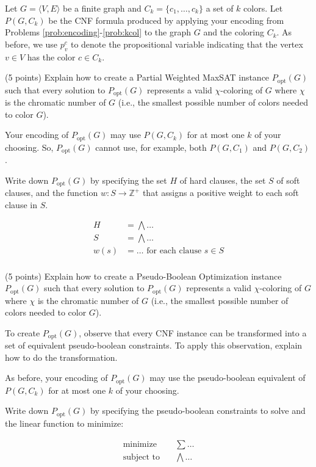 \documentclass{handout}
\begin{document}
Let $G = \langle V, E\rangle$ be a finite graph and $C_k = \{ c_1, \ldots, c_k \}$ a set of $k$ colors. 
Let $P(G, C_k)$ be the CNF formula produced by applying your encoding from Problems \ref{prob:encoding}-\ref{prob:kcol}  
to the graph $G$ and the coloring $C_k$. 
As before, we use $p_v^c$ to denote the propositional variable indicating that the vertex $v\in V$ has the color $c\in C_k$.


\begin{questions}

\item (5 points) Explain how to create a Partial Weighted MaxSAT instance $P_{\text{opt}}(G)$ 
such that every solution to $P_{\text{opt}}(G)$ represents a valid $\chi$-coloring of $G$ where $\chi$ is 
the chromatic number of $G$ (i.e., the smallest possible number of colors needed to color $G$). 

Your encoding of  $P_{\text{opt}}(G)$ may use $P(G, C_k)$ for at most one $k$ of your choosing.  
So, $P_{\text{opt}}(G)$ cannot use, for example, both $P(G, C_1)$ and $P(G, C_2)$.

Write down  $P_{\text{opt}}(G)$ by specifying the set $H$ of hard clauses, 
the set $S$ of soft clauses, and the function $w : S \rightarrow \mathbb{Z^+}$ that assigns a positive weight to each soft clause in $S$. 

\begin{align*}
   H    	&=     \bigwedge \ldots \\
   S    	&=     \bigwedge \ldots \\
   w(s)    	&=    \ldots \text{ for each clause } s  \in S\\ 
\end{align*} 



\item (5 points)  Explain how to create a Pseudo-Boolean Optimization instance $P_{\text{opt}}(G)$ 
such that every solution to $P_{\text{opt}}(G)$ represents a valid $\chi$-coloring of $G$ where $\chi$ is 
the chromatic number of $G$ (i.e., the smallest possible number of colors needed to color $G$). 

To create $P_{\text{opt}}(G)$, observe that every CNF instance  
can be transformed into a set of equivalent pseudo-boolean constraints.  
To apply this observation, explain how to do the transformation. 

As before, your encoding of  $P_{\text{opt}}(G)$ may use the  pseudo-boolean equivalent of  $P(G, C_k)$ for at most one $k$ of your choosing.  


Write down  $P_{\text{opt}}(G)$ by specifying the pseudo-boolean constraints to solve and the linear function to minimize: 

\begin{align*}
   \text{minimize}  	 \quad& \sum \ldots \\
   \text{subject to}    	\quad&  \bigwedge \ldots \\
\end{align*} 




\end{questions}
\end{document}
